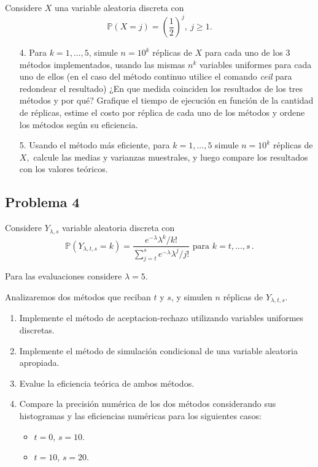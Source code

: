 \noindent Considere $X$ una variable aleatoria discreta con
\[\mathbb{P}(X=j)=\left( \frac{1}{2}\right)^{j},\ j\geq 1.\]

\begin{enumerate}
  \item[4.] Para $k=1,\dots,5$, simule $n=10^{k}$ r\'{e}plicas de $X$ para cada uno de los 3 m\'{e}todos implementados, usando las mismas $n^k$ variables uniformes para cada uno de ellos (en el caso del método continuo utilice el comando \emph{ceil} para redondear el resultado) ¿En que medida coinciden los resultados de los tres métodos y por qué? Grafique el tiempo de ejecuci\'{o}n en funci\'{o}n de la cantidad de r\'{e}plicas, estime el costo por réplica de cada uno de los m\'{e}todos y ordene los m\'{e}todos seg\'{u}n su eficiencia.

  \item[5.] Usando el m\'{e}todo m\'{a}s eficiente, para $k=1,...,5$ simule $n=10^{k}$ r\'{e}plicas de $X,$ calcule las medias y varianzas muestrales, y luego compare los resultados con los valores te\'{o}ricos.
\end{enumerate}
\fi

\subsection*{Problema 4}

Considere $Y_{\lambda ,s}$ variable aleatoria discreta con
$$ \mathbb{P}(Y_{\lambda,t,s}=k)=\frac{e^{-\lambda}\lambda^k/k!}{\sum^s_{j=t}e^{-\lambda}\lambda^j/j!} \text{ para }k=t,\dots,s \, .$$

Para las evaluaciones considere $\lambda = 5$.

Analizaremos dos métodos que reciban $t$ y $s$, y simulen $n$ réplicas de $Y_{\lambda,t,s}$.

\begin{enumerate}
    \item  Implemente el método de aceptacion-rechazo utilizando variables uniformes discretas.
    
    \item Implemente el método de simulación condicional de una variable aleatoria apropiada.
    
    \item Evalue la eficiencia teórica de ambos métodos.

  \item Compare la precisión numérica de los dos métodos considerando sus histogramas y las eficiencias numéricas para los siguientes casos:
  \begin{itemize}
      \item $t=0$, $s=10$.
      \item $t=10$, $s=20$.
  \end{itemize}
\end{enumerate}